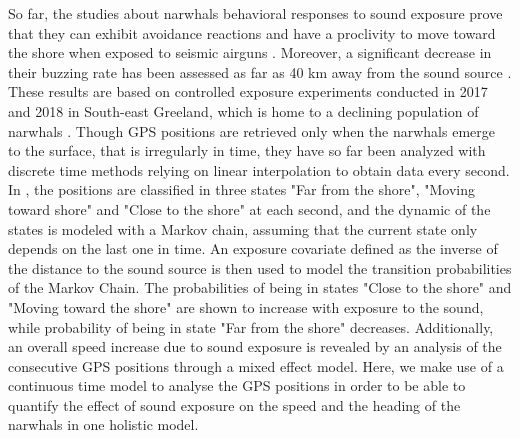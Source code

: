 \documentclass[11pt]{article}
\newcommand {\1}{\mathbb{1}}
\theoremstyle{definition}
\theoremstyle{remark}
\theoremstyle{remark}
\begin{document}
So far, the studies about narwhals behavioral responses to sound exposure prove that they can exhibit avoidance reactions and have a proclivity to move toward the shore when exposed to seismic airguns \cite{heide-jorgensen_behavioral_2021}. Moreover, a significant decrease in their buzzing rate has been assessed as far as 40 km away from the sound source \cite{tervo_narwhals_2021}. These results are based on controlled exposure experiments conducted in 2017 and 2018 in South-east Greeland, which is home to a declining population of narwhals \cite{garde_biological_2022}.  Though GPS positions are retrieved only when the narwhals emerge to the surface, that is irregularly in time, they have so far been analyzed with discrete time methods relying on linear interpolation to obtain data every second. In \cite{heide-jorgensen_behavioral_2021}, the positions are classified in three states "Far from the shore", "Moving toward shore" and "Close to the shore" at each second, and the dynamic of the states is modeled with a Markov chain, assuming that the current state only depends on the last one in time. An exposure covariate defined as the inverse of the distance to the sound source is then used to model the transition probabilities of the Markov Chain. The probabilities of being in states "Close to the shore" and "Moving toward the shore" are shown to increase with exposure to the sound, while probability of being in state "Far from the shore" decreases. Additionally, an overall speed increase due to sound exposure is revealed by an analysis of the consecutive GPS positions through a mixed effect model. 
Here, we  make use of a continuous time model to analyse the GPS positions in order to be able to quantify the effect of sound exposure on the speed and the heading of the narwhals in one holistic model. \\
\end{document}
